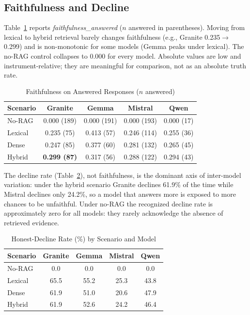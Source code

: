 \documentclass[conference]{IEEEtran}
\begin{document}
\subsection{Faithfulness and Decline}
Table~\ref{tab:faithfulness} reports \textit{faithfulness\_answered} ($n$ answered in parentheses). Moving from lexical to hybrid retrieval barely changes faithfulness (e.g., Granite 0.235$\rightarrow$0.299) and is non-monotonic for some models (Gemma peaks under lexical). The no-RAG control collapses to 0.000 for every model. Absolute values are low and instrument-relative; they are meaningful for comparison, not as an absolute truth rate.
\begin{table}[htbp]
\caption{Faithfulness on Answered Responses ($n$ answered)}
\begin{center}
\setlength{\tabcolsep}{3pt}
\begin{tabular}{lcccc}
\toprule
\textbf{Scenario} & \textbf{Granite} & \textbf{Gemma} & \textbf{Mistral} & \textbf{Qwen} \\
\midrule
No-RAG & 0.000 (189) & 0.000 (191) & 0.000 (193) & 0.000 (17) \\
Lexical & 0.235 (75) & 0.413 (57) & 0.246 (114) & 0.255 (36) \\
Dense & 0.247 (85) & 0.377 (60) & 0.281 (132) & 0.265 (45) \\
Hybrid & \textbf{0.299 (87)} & 0.317 (56) & 0.288 (122) & 0.294 (43) \\
\bottomrule
\end{tabular}
\label{tab:faithfulness}
\end{center}
\end{table}
The decline rate (Table~\ref{tab:decline}), not faithfulness, is the dominant axis of inter-model variation: under the hybrid scenario Granite declines 61.9\% of the time while Mistral declines only 24.2\%, so a model that answers more is exposed to more chances to be unfaithful. Under no-RAG the recognized decline rate is approximately zero for all models: they rarely acknowledge the absence of retrieved evidence.
\begin{table}[htbp]
\caption{Honest-Decline Rate (\%) by Scenario and Model}
\begin{center}
\setlength{\tabcolsep}{3pt}
\begin{tabular}{lcccc}
\toprule
\textbf{Scenario} & \textbf{Granite} & \textbf{Gemma} & \textbf{Mistral} & \textbf{Qwen} \\
\midrule
No-RAG & 0.0 & 0.0 & 0.0 & 0.0 \\
Lexical & 65.5 & 55.2 & 25.3 & 43.8 \\
Dense & 61.9 & 51.0 & 20.6 & 47.9 \\
Hybrid & 61.9 & 52.6 & 24.2 & 46.4 \\
\bottomrule
\end{tabular}
\label{tab:decline}
\end{center}
\end{table}
\end{document}
